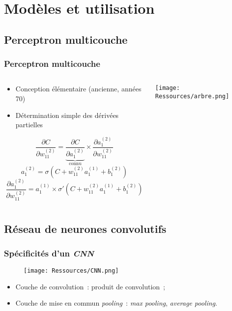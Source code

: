 \documentclass{beamer}
\begin{document}
  \section{Modèles et utilisation}
  \subsection{Perceptron multicouche}
  \begin{frame}
    \frametitle{Perceptron multicouche}
    \begin{columns}
      \begin{column}{5cm}
        \begin{itemize}
          \item Conception élémentaire (ancienne, années 70)
          \item Détermination simple des dérivées partielles
        \end{itemize}
        \[
          \frac{\partial C}{\partial w^{(2)}_{11}} = \underbrace{\frac{\partial C}{\partial a^{(2)}_{1}}}_{\text{connu}} \times \frac{\partial a^{(2)}_{1}}{\partial w^{(2)}_{11}}
        \]
        \[
          a^{(2)}_{1} = \sigma\left(C + w^{(2)}_{11}a^{(1)}_1 + b^{(2)}_1\right)
        \]
        \[
          \frac{\partial a^{(2)}_{1}}{\partial w^{(2)}_{11}} = a^{(1)}_1 \times \sigma'\left(C + w^{(2)}_{11}a^{(1)}_1 + b^{(2)}_1\right)
        \]
      \end{column}
      \begin{column}{5cm}
        \texttt{[image: Ressources/arbre.png]}
      \end{column}
    \end{columns}
  \end{frame}

  \subsection{Réseau de neurones convolutifs}
  \begin{frame}
    \frametitle{Spécificités d'un \textit{CNN}}
    \begin{figure}
      \texttt{[image: Ressources/CNN.png]}
    \end{figure}
    \begin{itemize}
      \item Couche de convolution~: produit de convolution~;
      \item Couche de mise en commun \textit{pooling}~: \textit{max pooling}, \textit{average pooling}.
    \end{itemize}
  \end{frame}
\end{document}
